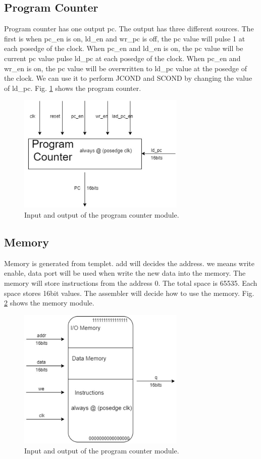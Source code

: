 \documentclass[../ProjectDocumentation.tex]{subfiles}
\begin{document}
\subsection{Program Counter}
Program counter has one output pc. The output has three different sources. The first is when
pc\_en is on, ld\_en and wr\_pc is off, the pc value will pulse 1 at each posedge of the clock. When
pc\_en and ld\_en is on, the pc value will be current pc value pulse ld\_pc at each posedge of the
clock. When pc\_en and wr\_en is on, the pc value will be overwritten to ld\_pc value at the
posedge of the clock. We can use it to perform JCOND and SCOND by changing the value of
ld\_pc. Fig. \ref{fig:pc} shows the program counter.
\begin{figure}
\centering
\includegraphics[width=8cm]{pc}
\caption{Input and output of the program counter module.}
\label{fig:pc}
\end{figure}

\subsection{Memory}
Memory is generated from templet. add will decides the address. we means write enable, data
port will be used when write the new data into the memory. The memory will store instructions
from the address 0. The total space is 65535. Each space stores 16bit values. The assembler will
decide how to use the memory. Fig. \ref{fig:memory} shows the memory module.
\begin{figure}
\centering
\includegraphics[width=8cm]{memory}
\caption{Input and output of the program counter module.}
\label{fig:memory}
\end{figure}
\end{document}
